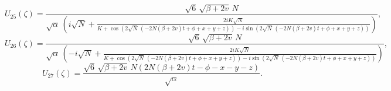\documentclass[10pt]{NSP1}
\numberwithin{equation}{section}
\begin{document}
\begin{equation}\label{U25}
U_{25} \! \left(\zeta \right) =
\frac{\sqrt{6}\, \sqrt{\beta +2 v}\, N}{\sqrt{\alpha}\, \left(i \sqrt{N}+\frac{2 i K \sqrt{N}}{K +\cos \left(2 \sqrt{N}\, \left(-2 N \left(\beta +2 v \right) t +\phi +x +y +z \right)\right)-i \sin \left(2 \sqrt{N}\, \left(-2 N \left(\beta +2 v \right) t +\phi +x +y +z \right)\right)}\right)},
\end{equation}
\begin{equation}\label{U26}
U_{26} \! \left(\zeta \right) =
\frac{\sqrt{6}\, \sqrt{\beta +2 v}\, N}{\sqrt{\alpha}\, \left(-i \sqrt{N}+\frac{2 i K \sqrt{N}}{K +\cos \left(2 \sqrt{N}\, \left(-2 N \left(\beta +2 v \right) t +\phi +x +y +z \right)\right)-i \sin \left(2 \sqrt{N}\, \left(-2 N \left(\beta +2 v \right) t +\phi +x +y +z \right)\right)}\right)},
\end{equation}
\begin{equation}\label{U27}
U_{27} \! \left(\zeta \right) =
\frac{\sqrt{6}\, \sqrt{\beta +2 v}\, N \left(2 N \left(\beta +2 v \right) t -\phi -x -y -z \right)}{\sqrt{\alpha}}.
\end{equation}


\FloatBarrier
\end{document}
